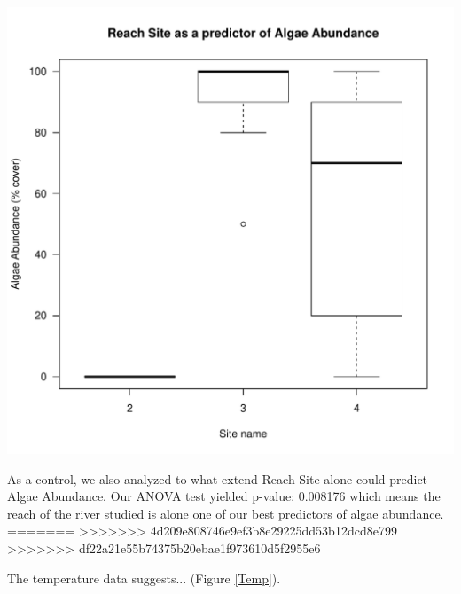 \documentclass{article}
\begin{document}
\begin{knitrout}
\color{fgcolor}
\includegraphics[width=\maxwidth]{figure/unnamed-chunk-6-1} 

\end{knitrout}
As a control, we also analyzed to what extend Reach Site alone could predict Algae Abundance. Our ANOVA test yielded p-value: 0.008176 which means the reach of the river studied is alone one of our best predictors of algae abundance. 
=======
>>>>>>> 4d209e808746e9ef3b8e29225dd53b12dcd8e799
>>>>>>> df22a21e55b74375b20ebae1f973610d5f2955e6

The temperature data suggests... (Figure \ref{Temp}).
\end{document}
